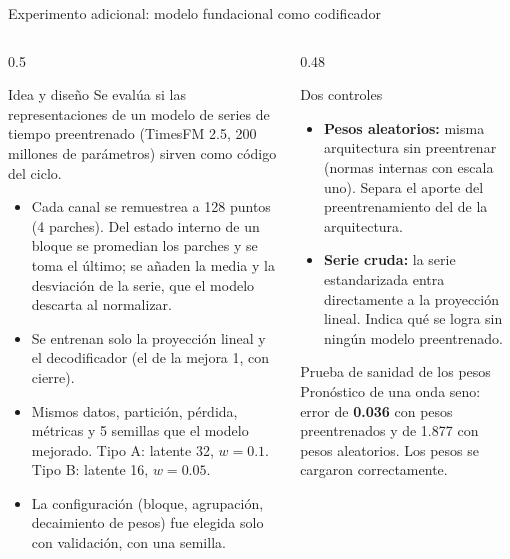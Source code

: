 \documentclass[aspectratio=169,10pt,t]{beamer}
\begin{document}
\begin{frame}{Experimento adicional: modelo fundacional como codificador}
\vspace{6pt}
\begin{columns}[T]
\begin{column}{0.5\textwidth}
\begin{block}{Idea y diseño}\scriptsize
Se evalúa si las representaciones de un modelo de series de tiempo preentrenado (TimesFM 2.5, 200 millones de parámetros) sirven como código del ciclo.
\begin{itemize}\setlength{\itemsep}{1pt}
\item Cada canal se remuestrea a 128 puntos (4 parches). Del estado interno de un bloque se promedian los parches y se toma el último; se añaden la media y la desviación de la serie, que el modelo descarta al normalizar.
\item Se entrenan solo la proyección lineal y el decodificador (el de la mejora 1, con cierre).
\item Mismos datos, partición, pérdida, métricas y 5 semillas que el modelo mejorado. Tipo A: latente 32, $w=0.1$. Tipo B: latente 16, $w=0.05$.
\item La configuración (bloque, agrupación, decaimiento de pesos) fue elegida solo con validación, con una semilla.
\end{itemize}
\end{block}
\end{column}
\begin{column}{0.48\textwidth}
\begin{alertblock}{Dos controles}\scriptsize
\begin{itemize}\setlength{\itemsep}{1pt}
\item \textbf{Pesos aleatorios:} misma arquitectura sin preentrenar (normas internas con escala uno). Separa el aporte del preentrenamiento del de la arquitectura.
\item \textbf{Serie cruda:} la serie estandarizada entra directamente a la proyección lineal. Indica qué se logra sin ningún modelo preentrenado.
\end{itemize}
\end{alertblock}
\begin{exampleblock}{Prueba de sanidad de los pesos}\scriptsize
Pronóstico de una onda seno: error de \textbf{0.036} con pesos preentrenados y de 1.877 con pesos aleatorios. Los pesos se cargaron correctamente.
\end{exampleblock}
\end{column}
\end{columns}
\end{frame}
\end{document}
